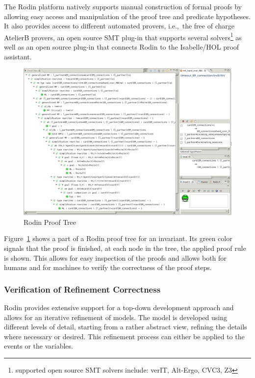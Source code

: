 The Rodin platform natively supports manual construction of formal proofs by
allowing easy access and manipulation of the proof tree and predicate
hypotheses. It also provides access to different automated provers, i.e.,\ the
free of charge AtelierB provers, an open source SMT plug-in that supports
several solvers\footnote{supported open source SMT solvers include: verIT,
  Alt-Ergo, CVC3, Z3} as well as an open source plug-in that connects Rodin to
the Isabelle/HOL proof assistant.

\begin{figure}[ht]
  \centering
  \includegraphics[width=1\textwidth]{figures/ProofTree}
  \caption{Rodin Proof Tree}
  \label{fig:proof-tree}
\end{figure}

Figure~\ref{fig:proof-tree} shows a part of a Rodin proof tree for an
invariant. Its green color signals that the proof is finished, at each node in
the tree, the applied proof rule is shown. This allows for easy inspection of
the proofs and allows both for humans and for machines to verify the correctness
of the proof steps.


\subsubsection{Verification of Refinement Correctness}
\label{sec:verif-refin-corr}

Rodin provides extensive support for a top-down development approach and allows
for an iterative refinement of models. The model is developed using different
levels of detail, starting from a rather abstract view, refining the details
where necessary or desired. This refinement process can either be applied to
the events or the variables.

